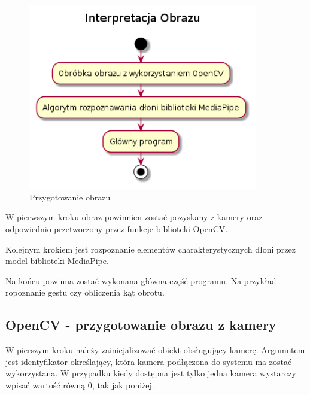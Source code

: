 \begin{figure}[H]
    \begin{center}
        \includegraphics[width=10cm]{../images/image_processing.png}
        \caption{Przygotowanie obrazu}
    \end{center}
\end{figure}

\quad W pierwszym kroku obraz powinnien zostać pozyskany z kamery oraz odpowiednio przetworzony przez funkcje biblioteki OpenCV. 

\quad Kolejnym krokiem jest rozpoznanie elementów charakterystycznych dłoni przez model biblioteki MediaPipe. 

\quad Na końcu powinna zostać wykonana główna część programu. Na przykład ropoznanie gestu czy obliczenia kąt obrotu. 

\subsection{OpenCV - przygotowanie obrazu z kamery}

\quad W pierszym kroku należy zainicjalizować obiekt obsługujący kamerę. Argumntem jest identyfikator określający, która kamera podłączona do systemu ma zostać wykorzystana. W przypadku kiedy dostępna jest tylko jedna kamera wystarczy wpisać wartość równą 0, tak jak poniżej.\newline




